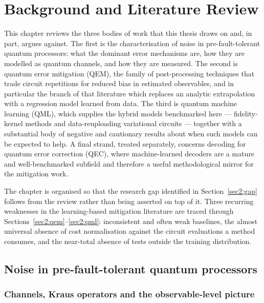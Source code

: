 \documentclass[Thesis.tex]{subfiles}
\begin{document}
\newpage
\setcounter{chapter}{1} %
\thispagestyle{empty}
\chapter{Background and Literature Review}\label{chap2:background}

This chapter reviews the three bodies of work that this thesis draws on and,
in part, argues against. The first is the characterisation of noise in
pre-fault-tolerant quantum processors: what the dominant error mechanisms are,
how they are modelled as quantum channels, and how they are measured. The
second is quantum error mitigation (QEM), the family of post-processing
techniques that trade circuit repetitions for reduced bias in estimated
observables, and in particular the branch of that literature which replaces an
analytic extrapolation with a regression model learned from data. The third is
quantum machine learning (QML), which supplies the hybrid models benchmarked
here --- fidelity-kernel methods and data-reuploading variational circuits ---
together with a substantial body of negative and cautionary results about when
such models can be expected to help. A final strand, treated separately,
concerns decoding for quantum error correction (QEC), where machine-learned
decoders are a mature and well-benchmarked subfield and therefore a useful
methodological mirror for the mitigation work.

The chapter is organised so that the research gap identified in
Section~\ref{sec2:gap} follows from the review rather than being asserted on
top of it. Three recurring weaknesses in the learning-based mitigation
literature are traced through Sections~\ref{sec2:qem}--\ref{sec2:qml}:
inconsistent and often weak baselines, the almost universal absence of
cost normalisation against the circuit evaluations a method consumes, and the
near-total absence of tests outside the training distribution.

\section{Noise in pre-fault-tolerant quantum processors}\label{sec2:noise}

\subsection{Channels, Kraus operators and the observable-level picture}
\end{document}
